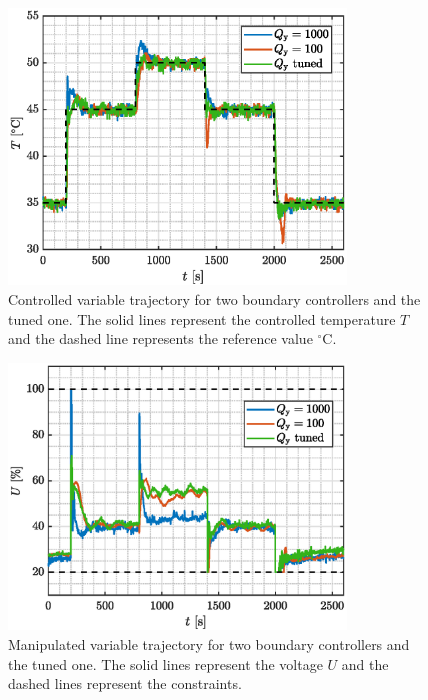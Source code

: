 \documentclass[preprint,12pt]{elsarticle}
\begin{document}
	\begin{figure}
		\begin{center}
			\includegraphics[width=0.8\textwidth]{images/CV}
			\caption{Controlled variable trajectory for two boundary controllers and the tuned one. The solid lines represent the controlled temperature $T$ and the dashed line represents the reference value $^{\circ}\mathrm{C}$.}
			\label{fig:CV}
		\end{center}
	\end{figure}
	
	\begin{figure}
		\begin{center}
			\includegraphics[width=0.8\textwidth]{images/MV}
			\caption{Manipulated variable trajectory for two boundary controllers and the tuned one. The solid lines represent the voltage $U$ and the dashed lines represent the constraints.}
			\label{fig:MV}
		\end{center}
	\end{figure}
	
\end{document}
